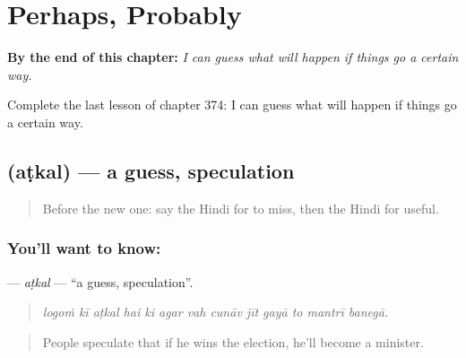 
\chapter{Perhaps, Probably}
\label{ch:hi-perhaps-probably}

\begin{chapteropening}
\textbf{By the end of this chapter:} \emph{I can guess what will happen if things go a certain way.}

Complete the last lesson of chapter 374: I can guess what will happen if things go a certain way.
\end{chapteropening}

\section[\texorpdfstring{\hi{अटकल} (aṭkal)}{अटकल (aṭkal)}]{ (aṭkal) — a guess, speculation}

\label{lesson:HI-C374-atkal}



\begin{quote}
Before the new one: say the Hindi for to miss, then the Hindi for useful.
\end{quote}

\subsection*{You'll want to know: }
\textbf{} — \emph{aṭkal} — \textquotedblleft{}a guess, speculation\textquotedblright{}.

\begin{quote}
            
\end{quote}

\begin{quote}
\emph{logoṁ kī aṭkal hai ki agar vah cunāv jīt gayā to mantrī banegā.}
\end{quote}

\begin{quote}
People speculate that if he wins the election, he'll become a minister.
\end{quote}

